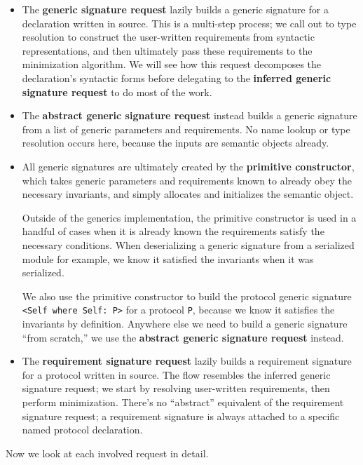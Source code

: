 \documentclass[../generics]{subfiles}
\begin{document}
\begin{itemize}
\item The \textbf{generic signature request} lazily builds a generic signature for a declaration written in source. This is a multi-step process; we call out to type resolution to construct the user-written requirements from syntactic representations, and then ultimately pass these requirements to the minimization algorithm. We will see how this request decomposes the declaration's syntactic forms before delegating to the \textbf{inferred generic signature request} to do most of the work.
\item The \textbf{abstract generic signature request} instead builds a generic signature from a list of generic parameters and requirements. No name lookup or type resolution occurs here, because the inputs are semantic objects already.
\item All generic signatures are ultimately created by the \textbf{primitive constructor}, which takes generic parameters and requirements known to already obey the necessary invariants, and simply allocates and initializes the semantic object.

Outside of the generics implementation, the primitive constructor is used in a handful of cases when it is already known the requirements satisfy the necessary conditions. When deserializing a generic signature from a serialized module for example, we know it satisfied the invariants when it was serialized.

We also use the primitive constructor to build the protocol generic signature \verb|<Self where Self: P>| for a protocol \texttt{P}, because we know it satisfies the invariants by definition. Anywhere else we need to build a generic signature ``from scratch,'' we use the \textbf{abstract generic signature request} instead.

\item The \textbf{requirement signature request} lazily builds a requirement signature for a protocol written in source. The flow resembles the inferred generic signature request; we start by resolving user-written requirements, then perform minimization. There's no ``abstract'' equivalent of the requirement signature request; a requirement signature is always attached to a specific named protocol declaration.
\end{itemize}
Now we look at each involved request in detail.
\end{document}
